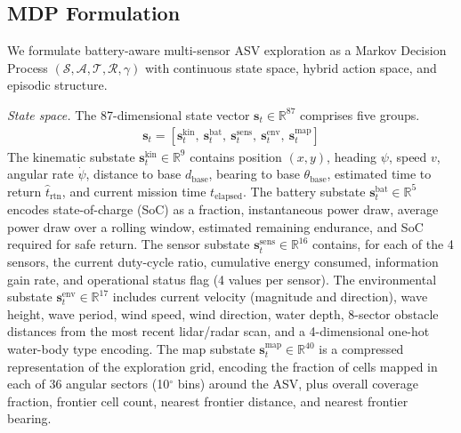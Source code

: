 \documentclass[conference]{IEEEtran}
\begin{document}
\subsection{MDP Formulation}

We formulate battery-aware multi-sensor ASV exploration as a Markov Decision Process $(\mathcal{S}, \mathcal{A}, \mathcal{T}, \mathcal{R}, \gamma)$ with continuous state space, hybrid action space, and episodic structure.

\textit{State space.} The 87-dimensional state vector $\boldsymbol{s}_t \in \mathbb{R}^{87}$ comprises five groups.
\begin{align}
\boldsymbol{s}_t = [\boldsymbol{s}_t^{\text{kin}},\ \boldsymbol{s}_t^{\text{bat}},\ \boldsymbol{s}_t^{\text{sens}},\ \boldsymbol{s}_t^{\text{env}},\ \boldsymbol{s}_t^{\text{map}}]
\end{align}
The kinematic substate $\boldsymbol{s}_t^{\text{kin}} \in \mathbb{R}^{9}$ contains position $(x, y)$, heading $\psi$, speed $v$, angular rate $\dot{\psi}$, distance to base $d_{\text{base}}$, bearing to base $\theta_{\text{base}}$, estimated time to return $\hat{t}_{\text{rtn}}$, and current mission time $t_{\text{elapsed}}$. The battery substate $\boldsymbol{s}_t^{\text{bat}} \in \mathbb{R}^{5}$ encodes state-of-charge (SoC) as a fraction, instantaneous power draw, average power draw over a rolling window, estimated remaining endurance, and SoC required for safe return. The sensor substate $\boldsymbol{s}_t^{\text{sens}} \in \mathbb{R}^{16}$ contains, for each of the 4 sensors, the current duty-cycle ratio, cumulative energy consumed, information gain rate, and operational status flag (4 values per sensor). The environmental substate $\boldsymbol{s}_t^{\text{env}} \in \mathbb{R}^{17}$ includes current velocity (magnitude and direction), wave height, wave period, wind speed, wind direction, water depth, 8-sector obstacle distances from the most recent lidar/radar scan, and a 4-dimensional one-hot water-body type encoding. The map substate $\boldsymbol{s}_t^{\text{map}} \in \mathbb{R}^{40}$ is a compressed representation of the exploration grid, encoding the fraction of cells mapped in each of 36 angular sectors (10$^\circ$ bins) around the ASV, plus overall coverage fraction, frontier cell count, nearest frontier distance, and nearest frontier bearing.
\end{document}
